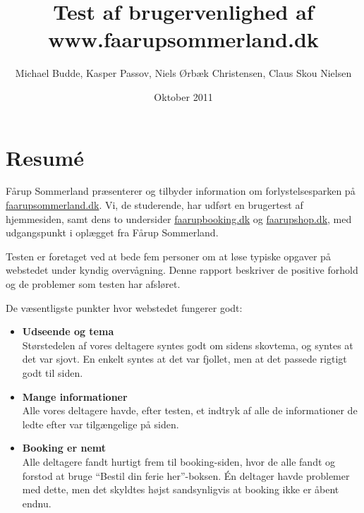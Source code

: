 \documentclass[10pt,a4paper]{article}      %
\author{Michael Budde, Kasper Passov, Niels Ørbæk Christensen, Claus Skou Nielsen}
\title{Test af brugervenlighed af www.faarupsommerland.dk}
\date{Oktober 2011}
\begin{document}
\maketitle
\newpage
\setcounter{page}{1}

\section*{Resumé}
\setcounter{page}{1} %

Fårup Sommerland præsenterer og tilbyder information om forlystelsesparken på
\url{faarupsommerland.dk}. Vi, de studerende, har udført en brugertest af
hjemmesiden, samt dens to undersider \url{faarupbooking.dk} og \url{faarupshop.dk}, med udgangspunkt i oplægget fra Fårup Sommerland.

Testen er foretaget ved at bede fem personer om at løse typiske
opgaver på webstedet under kyndig overvågning. Denne rapport beskriver de
positive forhold og de problemer som testen har afsløret.

\noindent De væsentligste punkter hvor webstedet fungerer godt:
\begin{itemize}
  \item \textbf{Udseende og tema}\\
  Størstedelen af vores deltagere syntes godt om sidens skovtema, og syntes at det var sjovt.
  En enkelt syntes at det var fjollet, men at det passede rigtigt godt til siden. 

  \item \textbf{Mange informationer}\\
  Alle vores deltagere havde, efter testen, et indtryk af alle de informationer de ledte efter
  var tilgængelige på siden. 

  \item \textbf{Booking er nemt}\\
  Alle deltagere fandt hurtigt frem til booking-siden, hvor de alle fandt og forstod at bruge
  ``Bestil din ferie her''-boksen. Én deltager havde problemer med dette, men det skyldtes
  højst sandsynligvis at booking ikke er åbent endnu.
\end{itemize}
\end{document}
